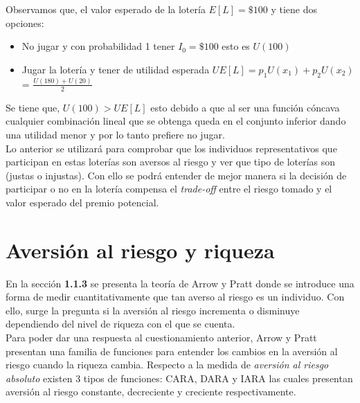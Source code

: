 Observamos que, el valor esperado de la lotería $E[L] = \$100$ y tiene dos opciones:

\begin{itemize}
    \item No jugar y con probabilidad 1 tener $I_0 = \$100$ esto es $U(100)$
    \item Jugar la lotería y tener de utilidad esperada $UE[L] = p_1U(x_1) + p_2U(x_2)$ = $\frac{U(180)+U(20)}{2}$
\end{itemize} 

\newpage

Se tiene que, $U(100) > UE[L]$ esto debido a que al ser una función cóncava cualquier combinación lineal que se obtenga queda en el conjunto inferior dando una utilidad menor y por lo tanto prefiere no jugar. \\

Lo anterior se utilizará para comprobar que los individuos representativos que participan en estas loterías son aversos al riesgo y ver que tipo de loterías son (justas o injustas). Con ello se podrá entender de mejor manera si la decisión de participar o no en la lotería compensa el \textit{trade-off} entre el riesgo tomado y el valor esperado del premio potencial.


\newpage

\section{Aversión al riesgo y riqueza}

En la sección \textbf{1.1.3} se presenta la teoría de Arrow y Pratt donde se introduce una forma de medir cuantitativamente que tan averso al riesgo es un individuo. Con ello, surge la pregunta si la aversión al riesgo incrementa o disminuye dependiendo del nivel de riqueza con el que se cuenta. \\

Para poder dar una respuesta al cuestionamiento anterior, Arrow y Pratt presentan una familia de funciones para entender los cambios en la aversión al riesgo cuando la riqueza cambia. Respecto a  la medida de \textit{aversión al riesgo absoluto} existen 3 tipos de funciones:  CARA, DARA  y IARA las cuales presentan aversión al riesgo constante, decreciente y creciente respectivamente. \\

